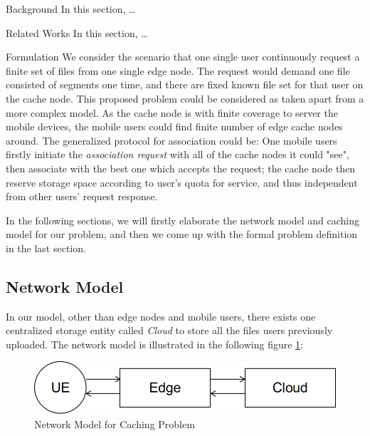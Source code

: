 \documentclass{article}
\begin{document}
\begin{section}{Background}
    \label{sec:background}
    In this section, \dots
\end{section}

\begin{section}{Related Works}
    \label{sec:review}
    In this section, \dots
\end{section}

\begin{section}{Formulation}
    \label{sec:formulation}
    We consider the scenario that one single user continuously request a finite set of files from one single edge node. The request would demand one file consisted of segments one time, and there are fixed known file set for that user on the cache node.
    This proposed problem could be considered as taken apart from a more complex model. As the cache node is with finite coverage to server the mobile devices, the mobile users could find finite number of edge cache nodes around. The generalized protocol for association could be: One mobile users firstly initiate the \textit{association request} with all of the cache nodes it could "see", then associate with the best one which accepts the request; the cache node then reserve storage space according to user's quota for service, and thus independent from other users' request response.
    
    In the following sections, we will firstly elaborate the network model and caching model for our problem, and then we come up with the formal problem definition in the last section.

    \subsection{Network Model}
    \label{net_model}
    In our model, other than edge nodes and mobile users, there exists one centralized storage entity called \emph{Cloud} to store all the files users previously uploaded.
    The network model is illustrated in the following figure \ref{fig:network}:

    \begin{figure}[h!]
        \centering
        \includegraphics[width=0.8\linewidth]{images/network.png}
        \caption{Network Model for Caching Problem}
        \label{fig:network}
    \end{figure}


\end{section}
\end{document}
